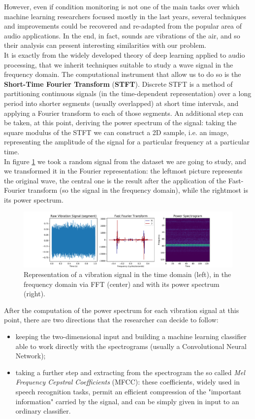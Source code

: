 \documentclass[../main.tex]{subfiles}
\begin{document}
However, even if condition monitoring is not one of the main tasks over which machine learning researchers focused mostly in the last years, several techniques and improvements could be recovered and re-adapted from the popular area of audio applications. In the end, in fact, sounds are vibrations of the air, and so their analysis can present interesting similarities with our problem.\\
It is exactly from the widely developed theory of deep learning applied to audio processing, that we inherit techniques suitable to study a wave signal in the frequency domain. The computational instrument that allow us to do so is the \textbf{Short-Time Fourier Transform} (\textbf{STFT}). Discrete STFT is a method of partitioning
continuous signals (in the time-dependent representation) over a long period into shorter segments (usually overlapped) at short time intervals, and
applying a Fourier transform to each of those segments. An additional step can be taken, at this point, deriving the power spectrum of the signal: taking the square modulus of the STFT we can construct a 2D sample, i.e. an image, representing the amplitude of the signal for a particular frequency at a particular time.\\
In figure \ref{fig:example_stft} we took a random signal from the dataset we are going to study, and we transformed it in the Fourier representation: the leftmost picture represents the original wave, the central one is the result after the application of the Fast-Fourier transform (so the signal in the frequency domain), while the rightmost is its power spectrum. 
\begin{figure}[ht]
	\centering
	\includegraphics[width=\textwidth]{pictures/example_stft}
	\caption{Representation of a vibration signal in the time domain (left), in the frequency domain via FFT (center) and with its power spectrum (right).}
	\label{fig:example_stft}	
\end{figure}
After the computation of the power spectrum for each vibration signal at this point, there are two directions that the researcher can decide to follow:
\begin{itemize}
	\item keeping the two-dimensional input and building a machine learning classifier able to work directly with the spectrograms (usually a Convolutional Neural Network);
	\item taking a further step and extracting from the spectrogram the so called \textit{Mel Frequency Cepstral Coefficients} (MFCC): these coefficients, widely used in speech recognition tasks, permit an efficient compression of the "important information" carried by the signal, and can be simply given in input to an ordinary classifier.
\end{itemize}
\end{document}
